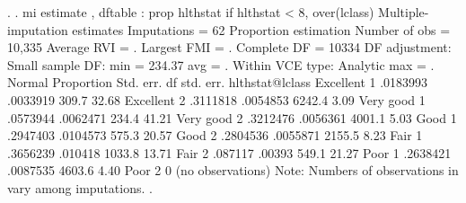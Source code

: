 {\smallskip}
. 
. mi estimate , dftable : prop hlthstat if hlthstat < 8, over(lclass) 
{\smallskip}
Multiple-imputation estimates     Imputations     =         62
Proportion estimation             Number of obs   =     10,335
                                  Average RVI     =          .
                                  Largest FMI     =          .
                                  Complete DF     =      10334
DF adjustment:   Small sample     DF:     min     =     234.37
                                          avg     =          .
Within VCE type:     Analytic             max     =          .
{\smallskip}
                {\VBAR}                                          Normal
                {\VBAR} Proportion   Std. err.           df   std. err.
hlthstat@lclass {\VBAR}
   Excellent 1  {\VBAR}   .0183993   .0033919         309.7       32.68
   Excellent 2  {\VBAR}   .3111818   .0054853        6242.4        3.09
   Very good 1  {\VBAR}   .0573944   .0062471         234.4       41.21
   Very good 2  {\VBAR}   .3212476   .0056361        4001.1        5.03
        Good 1  {\VBAR}   .2947403   .0104573         575.3       20.57
        Good 2  {\VBAR}   .2804536   .0055871        2155.5        8.23
        Fair 1  {\VBAR}   .3656239    .010418        1033.8       13.71
        Fair 2  {\VBAR}    .087117     .00393         549.1       21.27
        Poor 1  {\VBAR}   .2638421   .0087535        4603.6        4.40
        Poor 2  {\VBAR}          0  (no observations)
Note: Numbers of observations in {} vary among imputations.
{\smallskip}
. 
